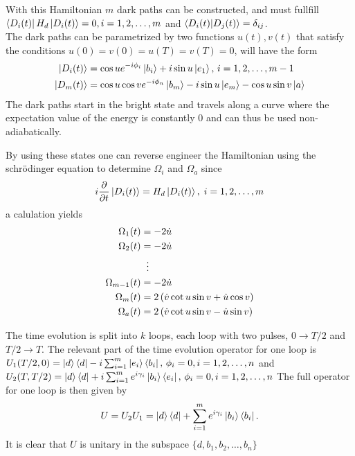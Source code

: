With this Hamiltonian $m$ dark paths can be constructed, and must fullfill $\bra{D_i(t)}H_d\ket{D_i(t)} = 0, i = 1,2,\dots,m$ and $\bra{D_i(t)}\ket{D_j(t)} = \delta_{ij}$.\\
The dark paths can be parametrized by two functions $u(t),v(t)$ that satisfy the conditions $u(0) = v(0) = u(T) = v(T) = 0$,  will have the form
\begin{equation}
\begin{aligned}
\ket{D_i(t)} &= \cos u e^{-i\phi_i}\ket{b_i} + i\sin u \ket{e_1},\, i = 1,2,\dots,m-1
\\
\ket{D_m(t)} &= \cos u \cos v e^{-i\phi_n}\ket{b_m} - i\sin u \ket{e_m} - \cos u \sin v \ket{a}
\end{aligned}
\end{equation}
The dark paths start in the bright state and travels along a curve where the expectation value of the energy is constantly $0$ and can thus be used non-adiabatically.

By using these states one can reverse engineer the Hamiltonian using the schrödinger equation to determine $\Omega_i$ and $\Omega_a$ since 
\begin{equation}
i\pdv{}{t}\ket{D_i(t)} = H_d\ket{D_i(t)},\; i = 1,2,\dots,m
\end{equation}
a calulation  yields
\begin{equation}
\begin{aligned}
\Omega_1(t) &= -2\dot{u}
\\ 
\Omega_2(t) &= -2\dot{u}
\\
&\hspace{2mm}\vdots
\\
\Omega_{m-1}(t) &= -2\dot{u}
\\
\Omega_m(t) &= 2\left(\dot{v}\cot u\sin v + \dot{u}\cos v \right)
\\
\Omega_a(t) &= 2\left(\dot{v}\cot u\sin v - \dot{u}\sin v \right)
\end{aligned}
\end{equation}

The time evolution is split into $k$ loops, each loop with two pulses, $0 \longrightarrow T/2$ and $T/2 \longrightarrow T$. The relevant part of the time evolution operator for one loop is  
$U_1(T/2,0) = \ket{d}\bra{d} -i\sum_{i = 1}^m \ket{e_i}\bra{b_i},\, \phi_i = 0, i = 1,2,\dots,n$ and $U_2(T,T/2) = \ket{d}\bra{d} + i\sum_{i = 1}^m e^{i\gamma_i}\ket{b_i}\bra{e_i},\, \phi_i = 0, i = 1,2,\dots,n $
The full operator for one loop is then given by 
\begin{equation}
U = U_2U_1 = \ket{d}\bra{d} + \sum_{i = 1}^{m}e^{i\gamma_i}\ket{b_i}\bra{b_i}.
\end{equation}
It is clear that $U$ is unitary in the subspace $\{d,b_1,b_2,\dots,b_n\}$

